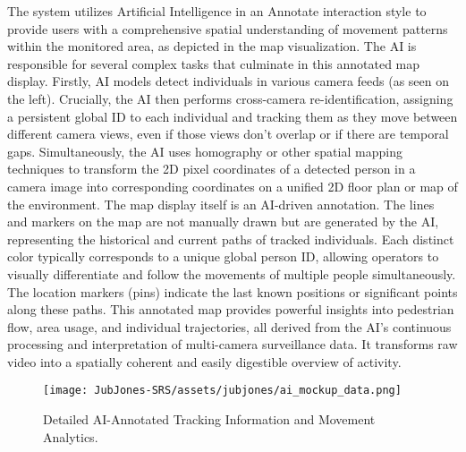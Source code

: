 The system utilizes Artificial Intelligence in an Annotate interaction style to provide users with a comprehensive spatial understanding of movement patterns within the monitored area, as depicted in the map visualization. The AI is responsible for several complex tasks that culminate in this annotated map display.
Firstly, AI models detect individuals in various camera feeds (as seen on the left). Crucially, the AI then performs cross-camera re-identification, assigning a persistent global ID to each individual and tracking them as they move between different camera views, even if those views don't overlap or if there are temporal gaps. Simultaneously, the AI uses homography or other spatial mapping techniques to transform the 2D pixel coordinates of a detected person in a camera image into corresponding coordinates on a unified 2D floor plan or map of the environment.
The map display itself is an AI-driven annotation. The lines and markers on the map are not manually drawn but are generated by the AI, representing the historical and current paths of tracked individuals. Each distinct color typically corresponds to a unique global person ID, allowing operators to visually differentiate and follow the movements of multiple people simultaneously. The location markers (pins) indicate the last known positions or significant points along these paths. This annotated map provides powerful insights into pedestrian flow, area usage, and individual trajectories, all derived from the AI's continuous processing and interpretation of multi-camera surveillance data. It transforms raw video into a spatially coherent and easily digestible overview of activity.

\begin{figure}[H]
    \centering
    \texttt{[image: JubJones-SRS/assets/jubjones/ai\_mockup\_data.png]}
    \caption{Detailed AI-Annotated Tracking Information and Movement Analytics.}
    \label{fig:ai_mockup_data}
\end{figure}

